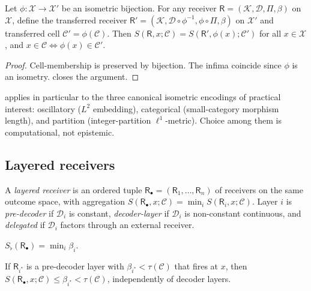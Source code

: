 \documentclass[11pt,twocolumn,a4paper]{article}
\newcommand{\K}{\mathcal{K}}
\newcommand{\D}{\mathcal{D}}
\newcommand{\X}{\mathcal{X}}
\newcommand{\Cell}{\mathcal{C}}
\newcommand{\receiver}{\mathsf{R}}
\newcommand{\Sfloor}{S_{\flat}}
\begin{document}
\begin{theorem}\label{thm:repinv}
Let $\phi:\X\to\X'$ be an isometric bijection. For any receiver
$\receiver=(\K,\D,\Pi,\beta)$ on $\X$, define the transferred receiver
$\receiver'=(\K,\D\circ\phi^{-1},\phi\circ\Pi,\beta)$ on $\X'$ and
transferred cell $\Cell'=\phi(\Cell)$. Then
$S(\receiver,x;\Cell)=S(\receiver',\phi(x);\Cell')$ for all $x\in\X$,
and $x\in\Cell\Leftrightarrow\phi(x)\in\Cell'$.
\end{theorem}

\begin{proof}
Cell-membership is preserved by bijection. The infima coincide since
$\phi$ is an isometry.  closes the argument.
\end{proof}

\begin{remark}\label{rem:three-enc}
 applies in particular to the three canonical
isometric encodings of practical interest: oscillatory ($L^2$
embedding), categorical (small-category morphism length), and partition
(integer-partition $\ell^1$-metric). Choice among them is
computational, not epistemic.
\end{remark}

\subsection{Layered receivers}

\begin{definition}\label{def:layered}
A \emph{layered receiver} is an ordered tuple
$\receiver_\bullet=(\receiver_1,\dots,\receiver_n)$ of receivers on the
same outcome space, with aggregation
$S(\receiver_\bullet,x;\Cell)=\min_i S(\receiver_i,x;\Cell)$.
Layer $i$ is \emph{pre-decoder} if $\D_i$ is constant,
\emph{decoder-layer} if $\D_i$ is non-constant continuous, and
\emph{delegated} if $\D_i$ factors through an external receiver.
\end{definition}

\begin{proposition}\label{prop:layered-floor}
$\Sfloor(\receiver_\bullet)=\min_i\beta_i$.
\end{proposition}

\begin{theorem}\label{thm:nonpriv}
If $\receiver_{i^*}$ is a pre-decoder layer with
$\beta_{i^*}<\tau(\Cell)$ that fires at $x$, then
$S(\receiver_\bullet,x;\Cell)\le\beta_{i^*}<\tau(\Cell)$,
independently of decoder layers.
\end{theorem}
\end{document}
